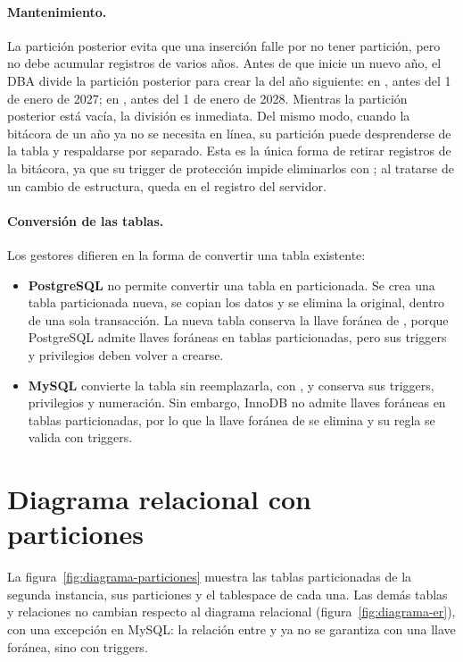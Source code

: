 \paragraph{Mantenimiento.} La partición posterior evita que una inserción falle por no tener partición, pero no debe acumular registros de varios años. Antes de que inicie un nuevo año, el DBA divide la partición posterior para crear la del año siguiente: en , antes del 1 de enero de 2027; en , antes del 1 de enero de 2028. Mientras la partición posterior está vacía, la división es inmediata. Del mismo modo, cuando la bitácora de un año ya no se necesita en línea, su partición puede desprenderse de la tabla y respaldarse por separado. Esta es la única forma de retirar registros de la bitácora, ya que su trigger de protección impide eliminarlos con ; al tratarse de un cambio de estructura, queda en el registro del servidor.

\paragraph{Conversión de las tablas.} Los gestores difieren en la forma de convertir una tabla existente:

\begin{itemize}[leftmargin=*]
	\item \textbf{PostgreSQL} no permite convertir una tabla en particionada. Se crea una tabla particionada nueva, se copian los datos y se elimina la original, dentro de una sola transacción. La nueva tabla conserva la llave foránea de , porque PostgreSQL admite llaves foráneas en tablas particionadas, pero sus triggers y privilegios deben volver a crearse.
	\item \textbf{MySQL} convierte la tabla sin reemplazarla, con , y conserva sus triggers, privilegios y numeración. Sin embargo, InnoDB no admite llaves foráneas en tablas particionadas, por lo que la llave foránea de  se elimina y su regla se valida con triggers.
\end{itemize}

\section{Diagrama relacional con particiones}

La figura~\ref{fig:diagrama-particiones} muestra las tablas particionadas de la segunda instancia, sus particiones y el tablespace de cada una. Las demás tablas y relaciones no cambian respecto al diagrama relacional (figura~\ref{fig:diagrama-er}), con una excepción en MySQL: la relación entre  y  ya no se garantiza con una llave foránea, sino con triggers.


